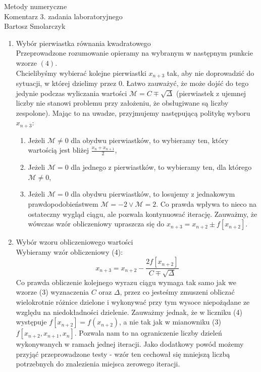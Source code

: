 \documentclass[12pt]{article}
\newcommand{\0}{x_{n}}
\newcommand{\1}{x_{n+1}}
\newcommand{\2}{x_{n+2}}
\newcommand{\3}{x_{n+3}}
\begin{document}
\begin{center}
	{\Huge Metody numeryczne}\\[7pt]
	Komentarz 3. zadania laboratoryjnego\\
	Bartosz Smolarczyk
\end{center}
\begin{enumerate}[1.]
\large\bf\item Wybór pierwiastka równania kwadratowego \boldsymbol{$\3$} \smallskip \\
\normalfont
\normalsize
Przeprowadzone rozumowanie opieramy na wybranym w następnym punkcie wzorze $(4)$. \medskip \\
Chcielibyśmy wybierać kolejne pierwiastki $\3$ tak, aby nie doprowadzić do sytuacji, w której dzielimy przez 0. Łatwo zauważyć, że może dojść do tego jedynie podczas \mbox{wyliczania} wartości $\mathcal{M} = C \mp \sqrt{\Delta}$ (pierwiastek z ujemnej liczby nie stanowi problemu przy \mbox{założeniu}, że obsługiwane są liczby zespolone). Mając to na uwadze, przyjmujemy \mbox{następującą} \mbox{politykę} wyboru $\3$:
\begin{enumerate}[$\bullet$]
\item Jeżeli $\mathcal{M} \neq 0$ dla obydwu pierwiastków, to wybieramy ten, który wartością jest bliżej $\frac{\0 + \1}{2}$,

\item Jeżeli $\mathcal{M} = 0$ dla jednego z pierwiastków, to wybieramy ten, dla którego $\mathcal{M}  \neq 0$,

\item Jeżeli $\mathcal{M} = 0$ dla obydwu pierwiastków, to losujemy z jednakowym prawdopodobieństwem $\mathcal{M} = -2 \vee \mathcal{M} = 2$. Co prawda wpływa to nieco na ostateczny wygląd ciągu, ale pozwala kontynuować iterację. Zauważmy, że wówczas wzór obliczeniowy upraszcza się do $\3 = \2 \pm f[\2]$.

\end{enumerate}
\bigskip
\large\bf\item Wybór wzoru obliczeniowego wartości \boldsymbol{$\3$} \smallskip \\
\normalfont
\normalsize
Wybieramy wzór obliczeniowy (4):
$$
\3 = \2 - \frac{2f[\2]}{C \mp \sqrt{\Delta}}
$$
Co prawda obliczenie kolejnego wyrazu ciągu wymaga tak samo jak we wzorze (3) wyznaczenia $C$ oraz $\Delta$, przez co jesteśmy zmuszeni obliczać wielokrotnie różnice dzielone i wykonywać przy tym wysoce niepożądane ze względu na niedokładności dzielenie. \mbox{Zauważmy} jednak, że w liczniku (4) występuje $f[\2] = f(\2)$, a nie tak jak w mianowniku (3) $f[\2,\1,\0]$. Pozwala nam to na ograniczenie liczby dzieleń wykonywanych w ramach jednej iteracji. Jako dodatkowy powód możemy przyjąć przeprowadzone testy - wzór ten cechował się mniejszą liczbą potrzebnych do znalezienia miejsca zerowego iteracji.\\


\end{enumerate}
\end{document}
